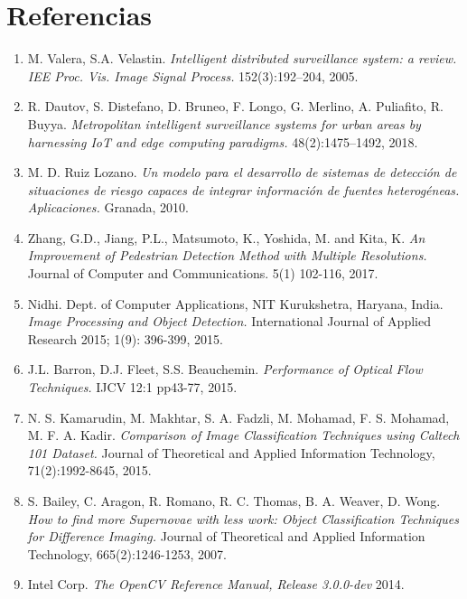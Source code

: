 \documentclass[a4paper,12pt,oneside,spanish]{book}
\begin{document}
\chapter{Referencias}
\setlength{\parskip}{3em}
\setlength{\parindent}{0em}
\begin{enumerate}
	\item M. Valera, S.A. Velastin. \textit{Intelligent distributed surveillance system: a review. IEE Proc. Vis. Image Signal Process.} 152(3):192–204, 2005.
	
	\item R. Dautov, S. Distefano, D. Bruneo, F. Longo, G. Merlino, A. Puliafito, R. Buyya. \textit{Metropolitan intelligent surveillance systems for urban areas by harnessing IoT and edge computing paradigms.} 48(2):1475–1492, 2018.

	\item M. D. Ruiz Lozano. \textit{Un modelo para el desarrollo de sistemas de detección de situaciones de riesgo capaces de integrar información de fuentes heterogéneas. Aplicaciones.} Granada, 2010.

	\item Zhang, G.D., Jiang, P.L., Matsumoto, K., Yoshida, M. and Kita, K. \textit{An Improvement of Pedestrian Detection Method with Multiple Resolutions.} Journal of Computer and Communications. 5(1) 102-116, 2017.

	\item Nidhi. Dept. of Computer Applications, NIT Kurukshetra, Haryana, India. \textit{Image Processing and Object Detection.} International Journal of Applied Research 2015; 1(9): 396-399, 2015.
	
	\item J.L. Barron, D.J. Fleet, S.S. Beauchemin. \textit{Performance of Optical Flow Techniques.} IJCV 12:1 pp43-77, 2015.
	
	\item N. S. Kamarudin, M. Makhtar, S. A. Fadzli, M. Mohamad, F. S. Mohamad, M. F. A. Kadir. \textit{Comparison of Image Classification Techniques using Caltech 101 Dataset.} Journal of Theoretical and Applied Information Technology, 71(2):1992-8645, 2015.
	
	\item S. Bailey, C. Aragon, R. Romano, R. C. Thomas, B. A. Weaver, D. Wong. \textit{How to find more Supernovae with less work: Object Classification Techniques for Difference Imaging.} Journal of Theoretical and Applied Information Technology, 665(2):1246-1253, 2007.
	
	\item Intel Corp. \textit{The OpenCV Reference Manual, Release 3.0.0-dev} 2014. 
			

\end{enumerate}
\end{document}
